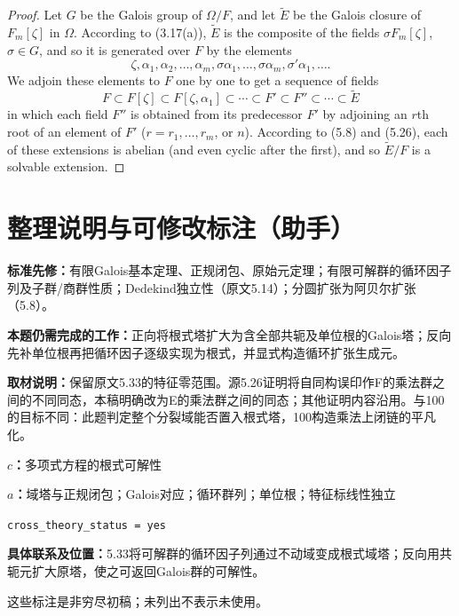 \documentclass[UTF8,11pt,a4paper]{ctexart}
\theoremstyle{definition}\newtheorem*{definition}{Definition}
\theoremstyle{remark}\newtheorem*{remark}{Remark}
\begin{document}
\begin{proof}
Let $G$ be the Galois group of $\Omega/F$, and let $\widetilde E$ be the Galois closure of $F_m[\zeta]$ in $\Omega$. According to (3.17(a)), $\widetilde E$ is the composite of the fields $\sigma F_m[\zeta]$, $\sigma\in G$, and so it is generated over $F$ by the elements
\[
\zeta,\alpha_1,\alpha_2,\ldots,\alpha_m,\sigma\alpha_1,\ldots,\sigma\alpha_m,
\sigma'\alpha_1,\ldots.
\]
We adjoin these elements to $F$ one by one to get a sequence of fields
\[
F\subset F[\zeta]\subset F[\zeta,\alpha_1]\subset\cdots
\subset F'\subset F''\subset\cdots\subset\widetilde E
\]
in which each field $F''$ is obtained from its predecessor $F'$ by adjoining an $r$th root of an element of $F'$ ($r=r_1,\ldots,r_m$, or $n$). According to (5.8) and (5.26), each of these extensions is abelian (and even cyclic after the first), and so $\widetilde E/F$ is a solvable extension.
\end{proof}

\section*{整理说明与可修改标注（助手）}
\textbf{标准先修：}有限Galois基本定理、正规闭包、原始元定理；有限可解群的循环因子列及子群/商群性质；Dedekind独立性（原文5.14）；分圆扩张为阿贝尔扩张（5.8）。

\textbf{本题仍需完成的工作：}正向将根式塔扩大为含全部共轭及单位根的Galois塔；反向先补单位根再把循环因子逐级实现为根式，并显式构造循环扩张生成元。

\textbf{取材说明：}保留原文5.33的特征零范围。源5.26证明将自同构误印作F的乘法群之间的不同同态，本稿明确改为E的乘法群之间的同态；其他证明内容沿用。与100的目标不同：此题判定整个分裂域能否置入根式塔，100构造乘法上闭链的平凡化。

\textbf{$c$：}多项式方程的根式可解性

\textbf{$a$：}域塔与正规闭包；Galois对应；循环群列；单位根；特征标线性独立

\texttt{cross\_theory\_status = yes}

\textbf{具体联系及位置：}5.33将可解群的循环因子列通过不动域变成根式域塔；反向用共轭元扩大原塔，使之可返回Galois群的可解性。

这些标注是非穷尽初稿；未列出不表示未使用。
\end{document}
